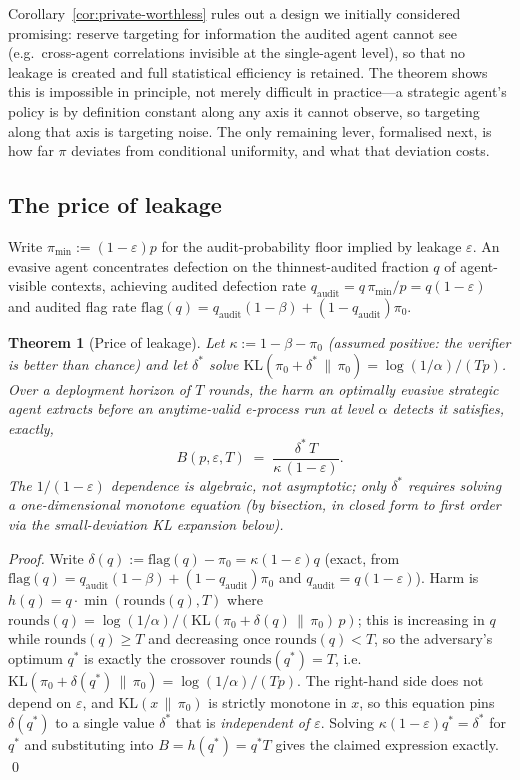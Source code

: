\documentclass[sigconf,anonymous]{aamas}
\theoremstyle{plain}
\newtheorem{theorem}{Theorem}
\theoremstyle{definition}
\begin{document}
Corollary~\ref{cor:private-worthless} rules out a design we initially
considered promising: reserve targeting for information the audited agent
cannot see (e.g.\ cross-agent correlations invisible at the single-agent
level), so that no leakage is created and full statistical efficiency is
retained. The theorem shows this is impossible in principle, not merely
difficult in practice---a strategic agent's policy is by definition constant
along any axis it cannot observe, so targeting along that axis is targeting
noise. The only remaining lever, formalised next, is how far $\pi$ deviates
from conditional uniformity, and what that deviation costs.

\subsection{The price of leakage}

Write $\pi_{\min} := (1-\varepsilon)p$ for the audit-probability floor
implied by leakage $\varepsilon$. An evasive agent concentrates defection on
the thinnest-audited fraction $q$ of agent-visible contexts, achieving
audited defection rate $q_{\mathrm{audit}} = q\,\pi_{\min}/p = q(1-\varepsilon)$
and audited flag rate $\mathrm{flag}(q) = q_{\mathrm{audit}}(1-\beta) +
(1-q_{\mathrm{audit}})\pi_0$.

\begin{theorem}[Price of leakage]
\label{thm:scaling}
Let $\kappa := 1-\beta-\pi_0$ (assumed positive: the verifier is
better than chance) and let $\delta^*$ solve
$\mathrm{KL}(\pi_0+\delta^* \,\|\, \pi_0) = \log(1/\alpha)/(Tp)$. Over a
deployment horizon of $T$ rounds, the harm an optimally evasive strategic
agent extracts before an anytime-valid e-process run at level $\alpha$
detects it satisfies, \emph{exactly},
\[B(p,\varepsilon,T) \;=\; \frac{\delta^*\, T}{\kappa\,(1-\varepsilon)}.\]
The $1/(1-\varepsilon)$ dependence is algebraic, not asymptotic; only
$\delta^*$ requires solving a one-dimensional monotone equation (by
bisection, in closed form to first order via the small-deviation KL
expansion below).
\end{theorem}

\begin{proof}
Write $\delta(q) := \mathrm{flag}(q) - \pi_0 = \kappa(1-\varepsilon)q$
(exact, from $\mathrm{flag}(q) = q_{\mathrm{audit}}(1-\beta) + (1-q_{\mathrm{audit}})\pi_0$
and $q_{\mathrm{audit}} = q(1-\varepsilon)$). Harm is $h(q) = q \cdot
\min(\mathrm{rounds}(q), T)$ where $\mathrm{rounds}(q) =
\log(1/\alpha)/(\mathrm{KL}(\pi_0+\delta(q)\,\|\,\pi_0)\,p)$; this is
increasing in $q$ while $\mathrm{rounds}(q) \ge T$ and decreasing once
$\mathrm{rounds}(q) < T$, so the adversary's optimum $q^*$ is exactly the
crossover $\mathrm{rounds}(q^*) = T$, i.e.\
$\mathrm{KL}(\pi_0+\delta(q^*)\,\|\,\pi_0) = \log(1/\alpha)/(Tp)$. The
right-hand side does not depend on $\varepsilon$, and $\mathrm{KL}(x\,\|\,\pi_0)$
is strictly monotone in $x$, so this equation pins $\delta(q^*)$ to a
single value $\delta^*$ that is \emph{independent of $\varepsilon$}.
Solving $\kappa(1-\varepsilon)q^* = \delta^*$ for $q^*$ and substituting into
$B = h(q^*) = q^*T$ gives the claimed expression exactly. \qed
\end{proof}
\end{document}
